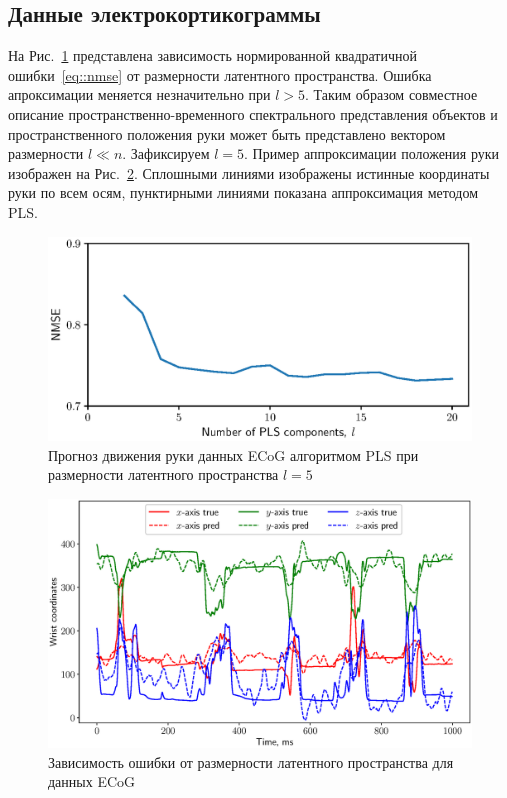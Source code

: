 \documentclass[12pt,twoside]{article}
\begin{document}
\subsection{Данные электрокортикограммы}

На Рис.~\ref{fig::ecog_n_comp} представлена зависимость нормированной квадратичной ошибки~\eqref{eq::nmse} от размерности латентного пространства. Ошибка апроксимации меняется незначительно при $l > 5$.
Таким образом совместное описание пространственно-временного спектрального представления объектов и пространственного положения руки может быть представлено вектором размерности $l \ll n$.
Зафиксируем $l = 5$. 
Пример аппроксимации положения руки изображен на Рис.~\ref{fig::ecog_prediction}. 
Сплошными линиями изображены истинные координаты руки по всем осям, пунктирными линиями показана аппроксимация методом PLS.

\begin{figure}[!h]
	\centering
	\includegraphics[width=0.75\linewidth]{figs/ecog_n_comp}
	\caption{Прогноз движения руки данных ECoG алгоритмом PLS при размерности латентного пространства $l=5$}
	\label{fig::ecog_n_comp}
\end{figure}

\begin{figure}[!h]
	\centering
	\includegraphics[width=\textwidth]{figs/ecog_prediction}
	\caption{Зависимость ошибки от размерности латентного пространства для данных ECoG}
	\label{fig::ecog_prediction}
\end{figure}
\end{document}
